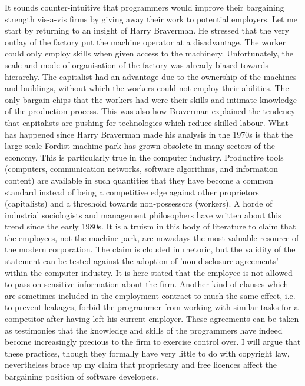 It sounds counter-intuitive that programmers would improve their bargaining
strength vis-a-vis f\hbox{}irms by giving away their work to potential
employers. Let me start by returning to an insight of Harry Braverman. He
stressed that the very outlay of the factory put the machine operator at a
disadvantage. The worker could only employ skills when given access to the
machinery.  Unfortunately, the scale and mode of organisation of the factory was
already biased towards hierarchy. The capitalist had an advantage due to the
ownership of the machines and buildings, without which the workers could not
employ their abilities. The only bargain chips that the workers had were their
skills and intimate knowledge of the production process. This was also how
Braverman explained the tendency that capitalists are pushing for technologies
which reduce skilled labour. What has happened since Harry Braverman made his
analysis in the 1970s is that the large-scale Fordist machine park has grown
obsolete in many sectors of the economy. This is particularly true in the
computer industry. Productive tools (computers, communication networks, software
algorithms, and information content) are available in such quantities that they
have become a common standard instead of being a competitive edge against other
proprietors (capitalists) and a threshold towards non-possessors (workers). A
horde of industrial sociologists and management philosophers have written about
this trend since the early 1980s\cite{gnunited-zuboff88}. It is a truism in this
body of literature to claim that the employees, not the machine park, are
nowadays the most valuable resource of the modern corporation. The claim is
clouded in rhetoric, but the validity of the statement can be tested against the
adoption of 'non-disclosure agreements' within the computer industry. It is here
stated that the employee is not allowed to pass on sensitive information about
the f\hbox{}irm. Another kind of clauses which are sometimes included in the
employment contract to much the same ef\hbox{}fect, i.e. to prevent leakages,
forbid the programmer from working with similar tasks for a competitor after
having left his current employer. These agreements can be taken as testimonies
that the knowledge and skills of the programmers have indeed become increasingly
precious to the f\hbox{}irm to exercise control over. I will argue that these
practices, though they formally have very little to do with copyright law,
nevertheless brace up my claim that proprietary and free licences af\hbox{}fect
the bargaining position of software developers.

